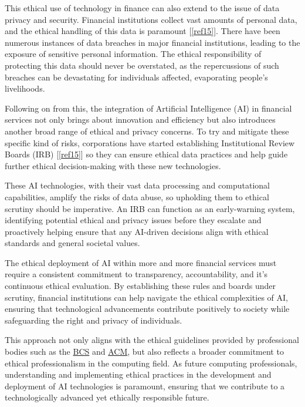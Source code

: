 \documentclass{article}
\begin{document}
This ethical use of technology in finance can also extend to the issue of data privacy and security. Financial institutions collect vast amounts of personal data, and the ethical handling of this data is paramount [\ref{ref15}]. There have been numerous instances of data breaches in major financial institutions, leading to the exposure of sensitive personal information. The ethical responsibility of protecting this data should never be overstated, as the repercussions of such breaches can be devastating for individuals affected, evaporating people's livelihoods.\\\vspace{0.3cm}

Following on from this, the integration of Artificial Intelligence (AI) in financial services not only brings about innovation and efficiency but also introduces another broad range of ethical and privacy concerns. To try and mitigate these specific kind of risks, corporations have started establishing Institutional Review Boards (IRB) [\ref{ref15}] so they can ensure ethical data practices and help guide further ethical decision-making with these new technologies.\\\vspace{0.3cm}

These AI technologies, with their vast data processing and computational capabilities, amplify the risks of data abuse, so upholding them to ethical scrutiny should be imperative. An IRB can function as an early-warning system, identifying potential ethical and privacy issues before they escalate and proactively helping ensure that any AI-driven decisions align with ethical standards and general societal values.\\\vspace{0.3cm}

The ethical deployment of AI within more and more financial services must require a consistent commitment to transparency, accountability, and it's continuous ethical evaluation. By establishing these rules and boards under scrutiny, financial institutions can help navigate the ethical complexities of AI, ensuring that technological advancements contribute positively to society while safeguarding the right and privacy of individuals.\\\vspace{0.3cm}

This approach not only aligns with the ethical guidelines provided by professional bodies such as the \href{https://www.bcs.org/media/2211/bcs-code-of-conduct.pdf}{BCS} and \href{https://www.acm.org/code-of-ethics}{ACM}, but also reflects a broader commitment to ethical professionalism in the computing field. As future computing professionals, understanding and implementing ethical practices in the development and deployment of AI technologies is paramount, ensuring that we contribute to a technologically advanced yet ethically responsible future.\\\vspace{0.3cm}
\end{document}
